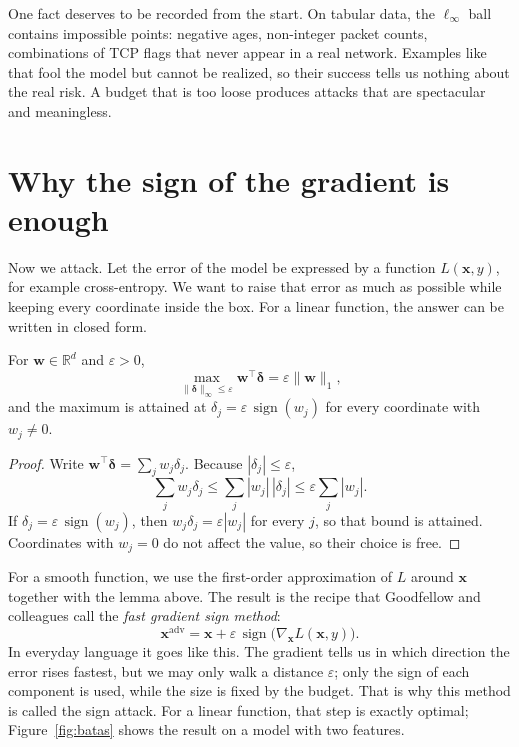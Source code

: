 One fact deserves to be recorded from the start. On tabular data, the
$\ell_\infty$ ball contains impossible points: negative ages, non-integer packet
counts, combinations of TCP flags that never appear in a real network. Examples
like that fool the model but cannot be realized, so their success tells us nothing
about the real risk. A budget that is too loose produces attacks that are
spectacular and meaningless.

\section{Why the sign of the gradient is enough}

Now we attack. Let the error of the model be expressed by a function
$L(\mathbf{x},y)$, for example cross-entropy. We want to raise that error as much
as possible while keeping every coordinate inside the box. For a linear function,
the answer can be written in closed form.


\begin{lemma}
For $\mathbf{w}\in\mathbb{R}^{d}$ and $\varepsilon>0$,
\[
  \max_{\lVert\boldsymbol{\delta}\rVert_\infty\le\varepsilon}
  \mathbf{w}^{\top}\boldsymbol{\delta}
  =\varepsilon\lVert\mathbf{w}\rVert_1,
\]
and the maximum is attained at $\delta_j=\varepsilon\,\operatorname{sign}(w_j)$ for every
coordinate with $w_j\neq0$.
\end{lemma}

\begin{proof}
Write $\mathbf{w}^{\top}\boldsymbol{\delta}=\sum_j w_j\delta_j$. Because
$|\delta_j|\le\varepsilon$,
\[
  \sum_j w_j\delta_j\le\sum_j|w_j|\,|\delta_j|\le\varepsilon\sum_j|w_j|.
\]
If $\delta_j=\varepsilon\,\operatorname{sign}(w_j)$, then $w_j\delta_j=\varepsilon|w_j|$
for every $j$, so that bound is attained. Coordinates with $w_j=0$ do not
affect the value, so their choice is free.
\end{proof}

For a smooth function, we use the first-order approximation of $L$ around
$\mathbf{x}$ together with the lemma above. The result is the recipe that
Goodfellow and colleagues call the \emph{fast gradient sign method}:
\[
  \mathbf{x}^{\mathrm{adv}}
  =\mathbf{x}+\varepsilon\,\operatorname{sign}\bigl(\nabla_{\mathbf{x}}L(\mathbf{x},y)\bigr).
\]
In everyday language it goes like this. The gradient tells us in which direction
the error rises fastest, but we may only walk a distance $\varepsilon$; only the
sign of each component is used, while the size is fixed by the budget. That is why
this method is called the sign attack. For a linear function, that step is exactly
optimal; Figure~\ref{fig:batas} shows the result on a model with two features.

